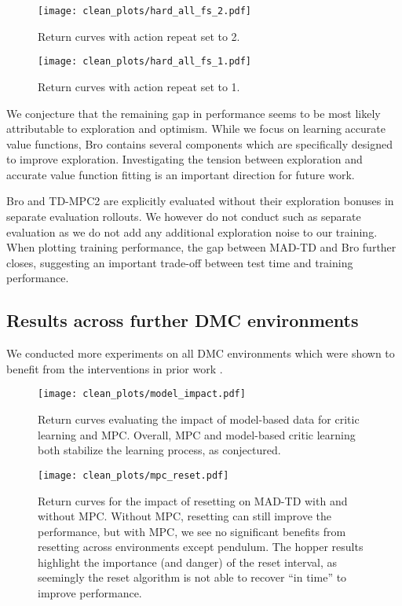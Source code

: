 \begin{figure}[H]
    \centering
    \texttt{[image: clean\_plots/hard\_all\_fs\_2.pdf]}
    \caption{Return curves with action repeat set to 2.}
    \label{fig:hard_all_fs_2}
\end{figure}

\begin{figure}[H]
    \centering
    \texttt{[image: clean\_plots/hard\_all\_fs\_1.pdf]}
    \caption{Return curves with action repeat set to 1.}
    \label{fig:hard_all_fs_1}
\end{figure}

We conjecture that the remaining gap in performance seems to be most likely attributable to exploration and optimism.
While we focus on learning accurate value functions, Bro contains several components which are specifically designed to improve exploration.
Investigating the tension between exploration and accurate value function fitting is an important direction for future work.

Bro and TD-MPC2 are explicitly evaluated without their exploration bonuses in separate evaluation rollouts.
We however do not conduct such as separate evaluation as we do not add any additional exploration noise to our training.
When plotting training performance, the gap between MAD-TD and Bro further closes, suggesting an important trade-off between test time and training performance.

\subsection{Results across further DMC environments}
\label{app:results_further}

We conducted more experiments on all DMC environments which were shown to benefit from the interventions in prior work \parencite{doro2023barrier,nauman2024bigger}.

\begin{figure}[h]
    \centering
    \texttt{[image: clean\_plots/model\_impact.pdf]}
    \caption{Return curves evaluating the impact of model-based data for critic learning and MPC. Overall, MPC and model-based critic learning both stabilize the learning process, as conjectured.}
    \label{fig:all_model_impact}
\end{figure}

\begin{figure}[H]
    \centering
    \texttt{[image: clean\_plots/mpc\_reset.pdf]}
    \caption{Return curves for the impact of resetting on MAD-TD with and without MPC. Without MPC, resetting can still improve the performance, but with MPC, we see no significant benefits from resetting across environments except pendulum. The hopper results highlight the importance (and danger) of the reset interval, as seemingly the reset algorithm is not able to recover ``in time'' to improve performance.}
    \label{fig:mpc_comp}
\end{figure}

